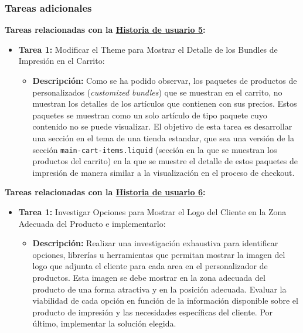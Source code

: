 \documentclass[12pt]{article}
\begin{document}
\subsubsection{Tareas adicionales}

\textbf{Tareas relacionadas con la \hyperref[sec:historia5]{Historia de usuario 5}:}
\begin{itemize}
    \item \textbf{Tarea 1:} Modificar el Theme para Mostrar el Detalle de los Bundles de Impresión en el Carrito:
          \begin{itemize}[label=--]
              \item \textbf{Descripción:} Como se ha podido observar, los paquetes de productos de personalizados (\textit{customized bundles}) que se muestran en el carrito, no muestran los detalles de los artículos que contienen con sus precios. Estos paquetes se muestran como un solo artículo de tipo paquete cuyo contenido no se puede visualizar. El objetivo de esta tarea es desarrollar una sección en el tema de una tienda estandar, que sea una versión de la sección \texttt{main-cart-items.liquid} (sección en la que se muestran los productos del carrito) en la que se muestre el detalle de estos paquetes de impresión de manera similar a la visualización en el proceso de checkout.
          \end{itemize}
\end{itemize}


\textbf{Tareas relacionadas con la \hyperref[sec:historia6]{Historia de usuario 6}:}
\begin{itemize}
    \item \textbf{Tarea 1:} Investigar Opciones para Mostrar el Logo del Cliente en la Zona Adecuada del Producto e implementarlo:
          \begin{itemize}[label=--]
              \item \textbf{Descripción:} Realizar una investigación exhaustiva para identificar opciones, librerías u herramientas que permitan mostrar la imagen del logo que adjunta el cliente para cada area en el personalizador de productos. Esta imagen se debe mostrar en la zona adecuada del producto de una forma atractiva y en la posición adecuada. Evaluar la viabilidad de cada opción en función de la información disponible sobre el producto de impresión y las necesidades específicas del cliente. Por último, implementar la solución elegida.
          \end{itemize}
\end{itemize}
\end{document}
